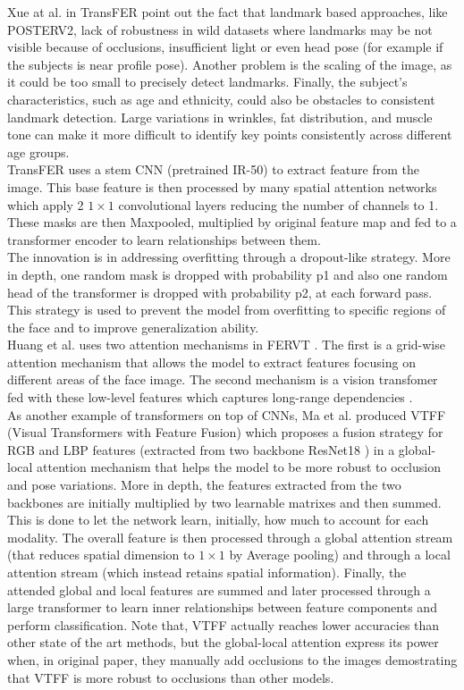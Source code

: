 Xue at al. in TransFER\cite{RW_4_TRANSFER} point out the fact that landmark based approaches, like POSTERV2, lack of robustness in wild datasets where landmarks may be not visible because of occlusions, insufficient light or even head pose (for example if the subjects is near profile pose). Another problem is the scaling of the image, as it could be too small to precisely detect landmarks. Finally, the subject's characteristics, such as age and ethnicity, could also be obstacles to consistent landmark detection. Large variations in wrinkles, fat distribution, and muscle tone can make it more difficult to identify key points consistently across different age groups.\\
TransFER uses a stem CNN (pretrained IR-50) to extract feature from the image. This base feature is then processed by many spatial attention networks which apply 2 $1\times1$ convolutional layers reducing the number of channels to 1. These masks are then Maxpooled, multiplied by original feature map and fed to a transformer encoder to learn relationships between them.\\
The innovation is in addressing overfitting through a dropout-like strategy. More in depth, one random mask is dropped with probability p1 and also one random head of the transformer is dropped with probability p2, at each forward pass. This strategy is used to prevent the model from overfitting to specific regions of the face and to improve generalization ability.\\

Huang et al. uses two attention mechanisms in FERVT \cite{RW_3_FERVT}. The first is a grid-wise attention mechanism that allows the model to extract features focusing on different areas of the face image. The second mechanism is a vision transfomer fed with these low-level features which captures long-range dependencies .\\

As another example of transformers on top of CNNs, Ma et al. produced VTFF (Visual Transformers with Feature Fusion) \cite{RW_6_VTFF} which proposes a fusion strategy for RGB and LBP features (extracted from two backbone ResNet18 \cite{ResNet}) in a global-local attention mechanism that helps the model to be more robust to occlusion and pose variations. More in depth, the features extracted from the two backbones are initially multiplied by two learnable matrixes and then summed. This is done to let the network learn, initially, how much to account for each modality. The overall feature is then processed through a global attention stream (that reduces spatial dimension to $1\times1$ by Average pooling) and through a local attention stream (which instead retains spatial information). Finally, the attended global and local features are summed and later processed through a large transformer to learn inner relationships between feature components and perform classification. Note that, VTFF actually reaches lower accuracies than other state of the art methods, but the global-local attention express its power when, in original paper, they manually add occlusions to the images demostrating that VTFF is more robust to occlusions than other models.\\

